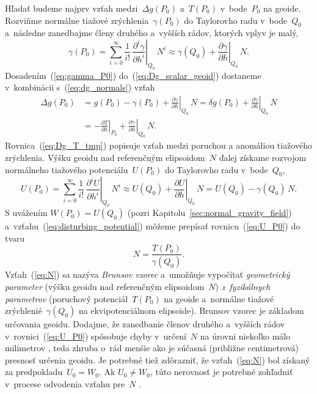 \documentclass[a4paper,12pt]{book}
\begin{document}
Hľadať budeme najprv vzťah medzi~$\Delta g(P_0)$ a~$T(P_0)$ v~bode~$P_0$ na 
geoide.  Rozviňme normálne tiažové zrýchlenia~$\gamma(P_0)$ do Taylorovho radu 
v~bode~$Q_0$ a~následne zanedbajme členy druhého a~vyšších rádov, ktorých vplyv 
je malý,
%
\begin{equation}
\label{eq:gamma_P0}
\gamma(P_0) = \sum_{i = 0}^\infty \frac{1}{i!} \, \left.\frac{\partial^i 
\gamma}{\partial h^i}\right|_{Q_0} \, N^i \approx \gamma(Q_0) 
+ \left.\frac{\partial \gamma}{\partial h}\right|_{Q_0} \, N{.}
\end{equation}
%
Dosadením~(\ref{eq:gamma_P0}) do~(\ref{eq:Dg_scalar_geoid}) dostaneme 
v~kombinácii s~(\ref{eq:dg_normals}) vzťah
%
\begin{equation}
\label{eq:Dg_T_tmp}
\begin{split}
\Delta g(P_0) &= g(P_0) - \gamma(P_0) + \left.\frac{\partial \gamma}{\partial 
h}\right|_{Q_0} \, N = \delta g(P_0) + \left.\frac{\partial \gamma}{\partial 
h}\right|_{Q_0} \, N\\
%
&=-\left.\frac{\partial T}{\partial h}\right|_{P_0} + \left.\frac{\partial 
\gamma}{\partial h}\right|_{Q_0} \, N{.}
\end{split}
\end{equation}
%
Rovnica~(\ref{eq:Dg_T_tmp}) popisuje vzťah medzi poruchou a anomáliou tiažového 
zrýchlenia.  Výšku geoidu nad referenčným elipsoidom~$N$ ďalej získame rozvojom 
normálneho tiažového potenciálu~$U(P_0)$ do Taylorovho radu v~bode~$Q_0$,
%
\begin{equation}
\label{eq:U_P0}
U(P_0) = \sum_{i = 0}^\infty \frac{1}{i!} \, \left.\frac{\partial^i U}{\partial 
h^i}\right|_{Q_0} \, N^i \approx U(Q_0) + \left.\frac{\partial U}{\partial 
h}\right|_{Q_0} \, N = U(Q_0) - \gamma(Q_0) \, N{.}
\end{equation}
%
S uvážením $W(P_0) = U(Q_0)$ (pozri Kapitolu~\ref{sec:normal_gravity_field}) 
a~vzťahu~(\ref{eq:disturbing_potential}) môžeme prepísať 
rovnicu~(\ref{eq:U_P0}) do tvaru
%
\begin{equation}
\label{eq:N}
N = \frac{T(P_0)}{\gamma(Q_0)}.
\end{equation}
%
Vzťah~(\ref{eq:N}) sa nazýva \emph{Brunsov vzorec} a~umožňuje vypočítať 
\emph{geometrický parameter} (výšku geoidu nad referenčným elipsoidom~$N$) 
\emph{z~fyzikálnych parametrov} (poruchový potenciál~$T(P_0)$ na geoide 
a~normálne tiažové zrýchlenié~$\gamma(Q_0)$ na ekvipotenciálnom elipsoide).  
Brunsov vzorec je základom určovania geoidu.  Dodajme, že zanedbanie členov 
druhého a~vyšších rádov v~rovnici~(\ref{eq:U_P0}) spôsobuje chyby v~určení~$N$ 
na úrovni niekoľko málo milimetrov \parencite{Jekeli2015,Sjoberg2017}, teda 
zhruba o~rád menšie ako je súčasná (približne centimetrová) presnosť určenia 
geoidu.  Je potrebné tiež zdôrazniť, že vzťah~(\ref{eq:N}) bol získaný za 
predpokladu~$U_0 = W_0$.  Ak $U_0 \neq W_0$, túto nerovnosť je potrebné 
zohľadniť v~procese odvodenia vzťahu pre~$N$ \parencite[pozri 
napríklad][]{VanicekGeodesy}.
\end{document}
